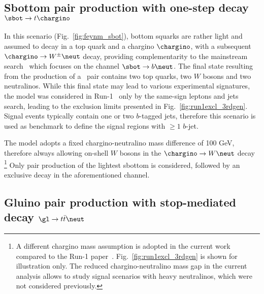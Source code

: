 \subsection{Sbottom pair production with one-step decay $\sbot\to t\chargino$}
\label{subsec:signals_sbot}

In this scenario (Fig.~\ref{fig:feynm_sbot}), bottom squarks are rather light and assumed to decay in a top quark and a chargino $\chargino$, 
with a subsequent $\chargino\to W^\pm\neut$ decay, 
providing complementarity to the mainstream search~\cite{ATLAS-CONF-2015-066} which focuses on the channel $\sbot\to b\neut$. 
The final state resulting from the production of a \sbsb\ pair contains two top quarks, two $W$ bosons and two neutralinos. 
While this final state may lead to various experimental signatures, 
the model was considered in Run-1~\cite{DraftSquarkGluinoSummaryPaper} 
only by the same-sign leptons and jets search, leading to the exclusion limits presented in Fig.~\ref{fig:run1excl_3rdgen}. 
Signal events typically contain one or two $b$-tagged jets, 
therefore this scenario is used as benchmark to define the signal regions with $\ge 1$ $b$-jet. 

The model adopts a fixed chargino-neutralino mass difference of 100 GeV, 
therefore always allowing on-shell $W$ bosons in the $\chargino\to W\neut$ decay
\footnote{A different chargino mass assumption is adopted in the current 
work compared to the Run-1 paper~\cite{DraftSquarkGluinoSummaryPaper}.
Fig.~\ref{fig:run1excl_3rdgen} is shown for illustration only.
The reduced chargino-neutralino mass gap in the current analysis 
allows to study signal scenarios with heavy neutralinos, which were not considered previously.}
Only pair production of the lightest sbottom is considered, followed by an exclusive decay in the aforementioned channel. 


\subsection{Gluino pair production with stop-mediated decay $\gl\to t\bar t\neut$}
\label{subsec:signals_gtt}

